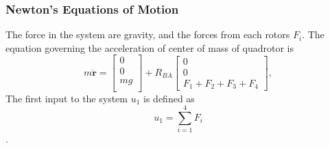 \documentclass[conference,onecolumn,10pt]{IEEEtran}
\begin{document}
\subsubsection{Newton's Equations of Motion}
The force in the system are gravity, and the forces from each rotors $F_i$. The equation governing the acceleration of center of mass of quadrotor is 
\begin{equation}
\label{nweq}
m\ddot{\textbf{r}} = \begin{bmatrix}
0 \\
0\\
mg \\
\end{bmatrix} + R_{BA} \begin{bmatrix}
0 \\
0\\
F_1 + F_2 + F_3 + F_4
\end{bmatrix},
\end{equation}
The first input to the system $u_1$ is defined as 
$$u_1 = \sum_{i=1}^4F_i$$.
\end{document}

